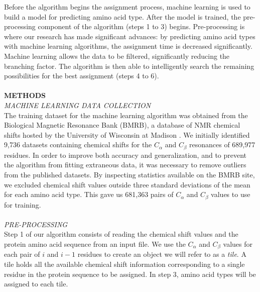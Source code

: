 \documentclass{article}
\begin{document}
\indent Before the algorithm begins the assignment process, machine learning is used to build a model for predicting amino acid type. After the model is trained, the pre-processing component of the algorithm (steps 1 to 3) begins. Pre-processing is where our research has made significant advances: by predicting amino acid types with machine learning algorithms, the assignment time is decreased significantly. Machine learning allows the data to be filtered, significantly reducing the branching factor. The algorithm is then able to intelligently search the remaining possibilities for the best assignment (steps 4 to 6). 
\\\\
\noindent\textbf{METHODS}\\
\noindent\textit{MACHINE LEARNING DATA COLLECTION}\\
\indent The training dataset for the machine learning algorithm was obtained from the Biological Magnetic Resonance Bank (BMRB), a database of NMR chemical shifts hosted by the University of Wisconsin at Madison \cite{biomagresbank}. We initially identified 9,736 datasets containing chemical shifts for the $C_{\alpha}$ and $C_{\beta}$ resonances of 689,977 residues. In order to improve both accuracy and generalization, and to prevent the algorithm from fitting extraneous data, it was necessary to remove outliers from the published datasets. By inspecting statistics available on the BMRB site, we excluded chemical shift values outside three standard deviations of the mean for each amino acid type. This gave us 681,363 pairs of $C_{\alpha}$ and $C_{\beta}$ values to use for training.
\\\\
\noindent\textit{PRE-PROCESSING}\\
\indent Step 1 of our algorithm consists of reading the chemical shift values and the protein amino acid sequence from an input file. We use the $C_{\alpha}$ and $C_{\beta}$ values for each pair of $i$ and $i-1$ residues to create an object we will refer to as a \textit{tile}. A tile holds all the available chemical shift information corresponding to a single residue in the protein sequence to be assigned. In step 3, amino acid types will be assigned to each tile.
\end{document}

